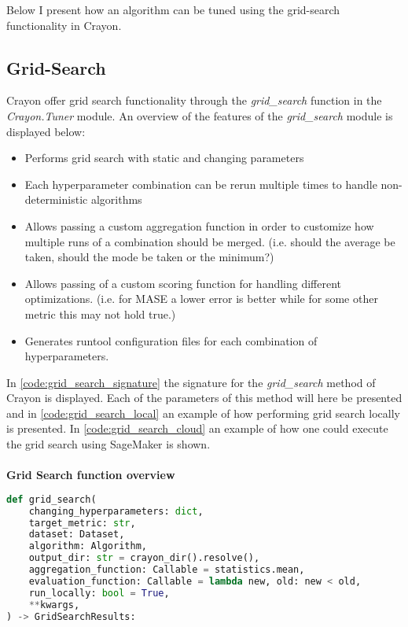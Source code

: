 Below I present how an algorithm can be tuned using the grid-search functionality in Crayon.

\subsection{Grid-Search}
Crayon offer grid search functionality through the \textit{grid\_search} function in the \textit{Crayon.Tuner} module. 
An overview of the features of the \textit{grid\_search} module is displayed below:

\begin{itemize}
\item Performs grid search with static and changing parameters
\item Each hyperparameter combination can be rerun multiple times to handle non-deterministic algorithms
\item Allows passing a custom aggregation function in order to customize how multiple runs of a combination should be merged. (i.e. should the average be taken, should the mode be taken or the minimum?)
\item Allows passing of a custom scoring function for handling different optimizations. (i.e. for MASE a lower error is better while for some other metric this may not hold true.)
\item Generates runtool configuration files for each combination of hyperparameters.
\end{itemize}

In \ref{code:grid_search_signature} the signature for the \textit{grid\_search} method of Crayon is displayed. Each of the parameters of this method will here be presented and in \ref{code:grid_search_local} an example of how performing grid search locally is presented. In \ref{code:grid_search_cloud} an example of how one could execute the grid search using SageMaker is shown.
\\
\\
\textbf{Grid Search function overview}
\\
\begin{lstlisting}[language=Python, label={code:grid_search_signature}, caption=Parameters of the grid search functionality in Crayon.]
def grid_search(
    changing_hyperparameters: dict,
    target_metric: str,
    dataset: Dataset,
    algorithm: Algorithm,
    output_dir: str = crayon_dir().resolve(),
    aggregation_function: Callable = statistics.mean,
    evaluation_function: Callable = lambda new, old: new < old,
    run_locally: bool = True,
    **kwargs,
) -> GridSearchResults:
\end{lstlisting}

